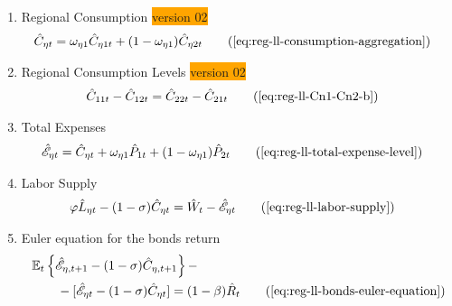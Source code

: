 \documentclass[../thesis.tex]{subfiles}
\begin{document}
{\begin{itemize}
\begin{enumerate}

\item Regional Consumption \colorbox{orange}{version 02}
\begin{align}
	\hat{C}_{\eta t} &= \omega_{\eta 1} \hat{C}_{\eta 1 t} + (1-\omega_{\eta 1}) \hat{C}_{\eta 2 t} \tag{\ref{eq:reg-ll-consumption-aggregation}}
\end{align}

\item Regional Consumption Levels \colorbox{orange}{version 02}
\begin{align}
	\hat{C}_{11t} - \hat{C}_{12t} &= \hat{C}_{22t} - \hat{C}_{21t} \tag{\ref{eq:reg-ll-Cn1-Cn2-b}}
\end{align}		

		
		\begin{comment}
			
		\item Regional Levels of Consumption and Prices
		\begin{align}
			\hat{C}_{\eta 1 t} - \hat{C}_{\eta 2 t} &= \hat{P}_{2 t} - \hat{P}_{1 t} \tag{\ref{eq:reg-ll-regional-consumption-and-prices}}
		\end{align}	
			
		\end{comment}
		
		
		\item Total Expenses
		\begin{align}
			\hat{\mathscr{E}}_{\eta t} &= \hat{C}_{\eta t} + \omega_{\eta 1} \hat{P}_{1 t} + (1 -\omega_{\eta 1}) \hat{P}_{2 t} \tag{\ref{eq:reg-ll-total-expense-level}}
		\end{align}

		\item Labor Supply
		\begin{alignat}{2}
			\varphi \hat{L}_{\eta t} - (1 -\sigma) \hat{C}_{\eta t} &= \hat{W}_t - \hat{ \mathscr{E} }_{\eta t} \tag{\ref{eq:reg-ll-labor-supply}}
		\end{alignat}
		
		\item Euler equation for the bonds return
		\begin{alignat}{2}
			& \E \left\{ \hat{\mathscr{E}}_{\eta, t+1} - (1 -\sigma)\hat{C}_{\eta, t+1} \right\} - \nonumber \\ & \qquad - [\hat{\mathscr{E}}_{\eta t} - (1 -\sigma)\hat{C}_{\eta t}] = (1 -\beta) \hat{R}_{t} \tag{\ref{eq:reg-ll-bonds-euler-equation}}
		\end{alignat}
		

\end{enumerate}
\end{itemize}}
\end{document}
